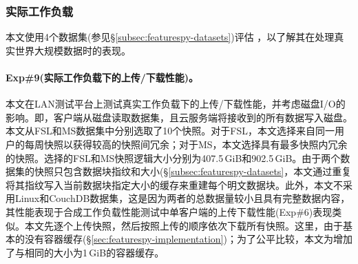\subsubsection{实际工作负载}
\label{subsubsec:featurespy-real}
本文使用4个数据集(参见\S\ref{subsec:featurespy-datasets})评估 \prototype，以了解其在处理真实世界大规模数据时的表现。

\paragraph*{Exp\#9(实际工作负载下的上传/下载性能)。}本文在LAN测试平台上测试真实工作负载下的上传/下载性能，并考虑磁盘I/O的影响。即，客户端从磁盘读取数据集，且云服务端将接收到的所有数据写入磁盘。本文从FSL和MS数据集中分别选取了10个快照。对于FSL，本文选择来自同一用户的每周快照以获得较高的快照间冗余；对于MS，本文选择具有最多快照内冗余的快照。选择的FSL和MS快照逻辑大小分别为407.5\,GiB和902.5\,GiB。由于两个数据集的快照只包含数据块指纹和大小(\S\ref{subsec:featurespy-datasets}，本文通过重复将其指纹写入当前数据块指定大小的缓存来重建每个明文数据块。此外，本文不采用Linux和CouchDB数据集，这是因为两者的总数据量较小且具有完整数据内容，其性能表现于合成工作负载性能测试中单客户端的上传下载性能(Exp\#6)表现类似。本文先逐个上传快照，然后按照上传的顺序依次下载所有快照。这里，由于基本的\sysnameS 没有容器缓存(\S\ref{sec:featurespy-implementation})；为了公平比较，本文为\sysnameS 增加了与\prototype 相同的大小为1\,GiB的容器缓存。


